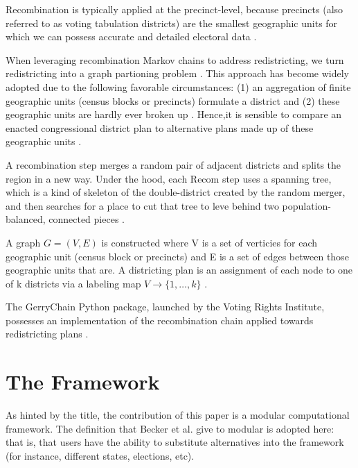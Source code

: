 \documentclass[sn-vancouver,Numbered]{sn-jnl}
\theoremstyle{thmstyleone}%
\theoremstyle{thmstyletwo}%
\theoremstyle{thmstylethree}%
\begin{document}
Recombination is typically applied at the precinct-level, because precincts (also referred to as voting tabulation districts) are the smallest geographic units for which we can possess accurate and detailed electoral data \cite{BeckerDuchinGoldHirsch2021}.

 When leveraging recombination Markov chains to address redistricting, we turn redistricting into a graph partioning problem \cite{deford2021recombination}. This approach has become widely adopted due to the following favorable circumstances: (1) an aggregation of finite geographic units (census blocks or precincts) formulate a district and (2) these geographic units are hardly ever broken up \cite{deford2021recombination}. Hence,it is sensible to compare an enacted congressional district plan to alternative plans made up of these geographic units \cite{deford2021recombination}.

 A recombination step merges a random pair of adjacent districts and splits the region in a new way. Under the hood, each Recom step uses a spanning tree, which is a kind of skeleton of the double-district created by the random merger, and then searches for a place to cut that tree to leve behind two population-balanced, connected pieces \cite{BeckerDuchinGoldHirsch2021}.

 A graph $G = (V, E)$ is constructed where V is a set of verticies for each geographic unit (census block or precincts) and E is a set of edges between those geographic units that are\cite{deford2021recombination}. A districting plan is an assignment of each node to one of k districts via a labeling map $V \to \{1, \ldots, k\}$ \cite{deford2021recombination}. 

The GerryChain Python package, launched by the Voting Rights Institute, possesses an implementation of the recombination chain applied towards redistricting plans \cite{deford2021recombination}.







\section{The Framework}\label{sec11}
As hinted by the title, the contribution of this paper is a modular computational framework. The definition that Becker et al. give to modular is adopted here: that is, that users have the ability to substitute alternatives into the framework \cite{BeckerDuchinGoldHirsch2021}
 (for instance, different states, elections, etc). 
\end{document}
